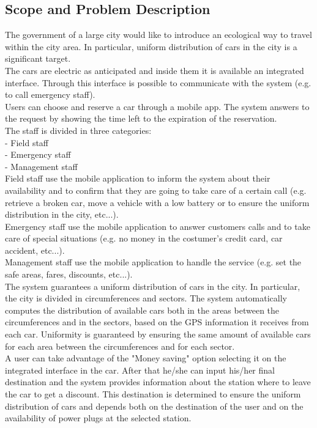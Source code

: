\documentclass[english]{article}
\begin{document}
	\subsection{Scope and Problem Description}
	
		The government of a large city would like to introduce an ecological way to travel within the city area. In particular, 				uniform distribution of cars in the city is a significant target.\\
		\tab \tab The cars are electric as anticipated and inside them it is available an integrated interface. Through this interface			is possible to communicate with the system (e.g. to call emergency staff).\\
		\tab \tab Users can choose and reserve a car through a mobile app. The system answers to the request by showing the 			time left to the expiration of the reservation.\\
		The staff is divided in three categories:\\
			- Field staff\\
			- Emergency staff\\
			- Management staff\\
		\tab \tab Field staff use the mobile application to inform the system about their availability and to confirm that they are 			going to take care of a certain call (e.g. retrieve a broken car, move a vehicle with a low battery or to ensure the uniform 			distribution in the city, etc...).\\
		\tab \tab Emergency staff use the mobile application to answer customers calls and to take care of special situations (e.g. 			no money in the costumer's credit card, car accident, etc...).\\
		\tab \tab Management staff use the mobile application to handle the service (e.g. set the safe areas, fares, discounts, 				etc...).\\
		\tab \tab The system guarantees a uniform distribution of cars in the city. In particular, the city is divided in 						circumferences and sectors. The system automatically computes the distribution of available cars both in the areas 				between the circumferences and in the sectors, based on the GPS information it receives from each car. Uniformity is 				guaranteed by ensuring the same amount of available cars for each area between the circumferences and for each sector.			\\
		\tab \tab A user can take advantage of the "Money saving" option selecting it on the integrated interface in the car. After 			that he/she can input his/her final destination and the system provides information about the station where to leave the 			car to get a discount. This destination is determined to ensure the uniform distribution of cars and depends both 				on the destination of the user and on the availability of power plugs at the selected station.
	
\end{document}
